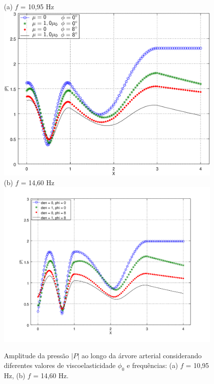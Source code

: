 \begin{figure}[!htbp]
	\centering
	(a) $f$ = 10,95 Hz\\
	\includegraphics[scale=0.7]{Figures/fig5_P_f10_95_viscoelasticity_viscosity_NEW.png}\\
	(b) $f$ = 14,60 Hz\\
	\includegraphics[scale=0.7]{Figures/fig5_P_f14_60_viscoelasticity_viscosity.png}\\
	\caption{Amplitude da pressão $|P|$ ao longo da árvore arterial considerando diferentes valores de viscoelasticidade $\phi_0$ e frequências: (a) $f$ = 10,95 Hz, (b) $f$ = 14,60 Hz.}
	\label{fig5b:arterial-tree}%
\end{figure}